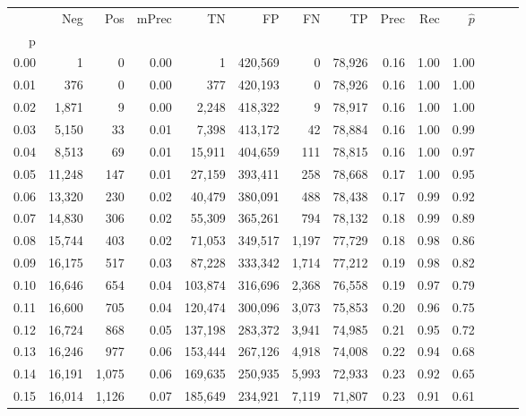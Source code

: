 \begin{tabular}{rrrrrrrrrrrrrr}
\toprule
{} &     Neg &    Pos & mPrec &       TN &       FP &      FN &      TP &  Prec &   Rec & $\hat{p}$ \\
p    &         &        &       &          &          &         &         &       &       &           \\
\midrule
0.00 &       1 &      0 &  0.00 &        1 &  420,569 &       0 &  78,926 &  0.16 &  1.00 &      1.00 \\
0.01 &     376 &      0 &  0.00 &      377 &  420,193 &       0 &  78,926 &  0.16 &  1.00 &      1.00 \\
0.02 &   1,871 &      9 &  0.00 &    2,248 &  418,322 &       9 &  78,917 &  0.16 &  1.00 &      1.00 \\
0.03 &   5,150 &     33 &  0.01 &    7,398 &  413,172 &      42 &  78,884 &  0.16 &  1.00 &      0.99 \\
0.04 &   8,513 &     69 &  0.01 &   15,911 &  404,659 &     111 &  78,815 &  0.16 &  1.00 &      0.97 \\
0.05 &  11,248 &    147 &  0.01 &   27,159 &  393,411 &     258 &  78,668 &  0.17 &  1.00 &      0.95 \\
0.06 &  13,320 &    230 &  0.02 &   40,479 &  380,091 &     488 &  78,438 &  0.17 &  0.99 &      0.92 \\
0.07 &  14,830 &    306 &  0.02 &   55,309 &  365,261 &     794 &  78,132 &  0.18 &  0.99 &      0.89 \\
0.08 &  15,744 &    403 &  0.02 &   71,053 &  349,517 &   1,197 &  77,729 &  0.18 &  0.98 &      0.86 \\
0.09 &  16,175 &    517 &  0.03 &   87,228 &  333,342 &   1,714 &  77,212 &  0.19 &  0.98 &      0.82 \\
0.10 &  16,646 &    654 &  0.04 &  103,874 &  316,696 &   2,368 &  76,558 &  0.19 &  0.97 &      0.79 \\
0.11 &  16,600 &    705 &  0.04 &  120,474 &  300,096 &   3,073 &  75,853 &  0.20 &  0.96 &      0.75 \\
0.12 &  16,724 &    868 &  0.05 &  137,198 &  283,372 &   3,941 &  74,985 &  0.21 &  0.95 &      0.72 \\
0.13 &  16,246 &    977 &  0.06 &  153,444 &  267,126 &   4,918 &  74,008 &  0.22 &  0.94 &      0.68 \\
0.14 &  16,191 &  1,075 &  0.06 &  169,635 &  250,935 &   5,993 &  72,933 &  0.23 &  0.92 &      0.65 \\
0.15 &  16,014 &  1,126 &  0.07 &  185,649 &  234,921 &   7,119 &  71,807 &  0.23 &  0.91 &      0.61 \\

\end{tabular}
